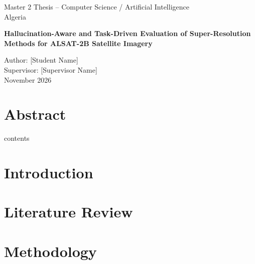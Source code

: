 \documentclass[12pt,a4paper]{report}
\begin{document}
\begin{titlepage}
    \centering
    \vspace*{1cm}
    
    {\Large Master 2 Thesis -- Computer Science / Artificial Intelligence} \\
    \vspace{0.5cm}
    {Algeria} \\
    \vspace{2cm}
    
    {\huge\bfseries Hallucination-Aware and Task-Driven Evaluation of Super-Resolution Methods for ALSAT-2B Satellite Imagery} \\
    \vfill
    \vspace{1cm}
    
    {\Large Author: [Student Name]} \\
    \vspace{0.5cm}
    {\Large Supervisor: [Supervisor Name]} \\
    \vspace{0.5cm}
    {\large November 2026} \\
    
\end{titlepage}

\chapter*{Abstract}


\tableof contents
\listoffigures
\listoftables

\chapter{Introduction}


\chapter{Literature Review}


\chapter{Methodology}

\end{document}
